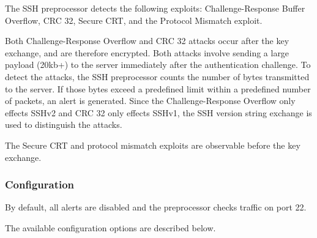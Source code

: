 \documentclass[english]{report}
\begin{document}
The SSH preprocessor detects the following exploits: Challenge-Response Buffer
Overflow, CRC 32, Secure CRT, and the Protocol Mismatch exploit.

Both Challenge-Response Overflow and CRC 32 attacks occur after the key
exchange, and are therefore encrypted.  Both attacks involve sending a large
payload (20kb+) to the server immediately after the authentication challenge.
To detect the attacks, the SSH preprocessor counts the number of bytes
transmitted to the server.  If those bytes exceed a predefined limit within a
predefined number of packets, an alert is generated.  Since the
Challenge-Response Overflow only effects SSHv2 and CRC 32 only effects SSHv1,
the SSH version string exchange is used to distinguish the attacks.

The Secure CRT and protocol mismatch exploits are observable before the key
exchange.

\subsubsection{Configuration}

By default, all alerts are disabled and the preprocessor checks traffic on port
22.

The available configuration options are described below.
\end{document}
